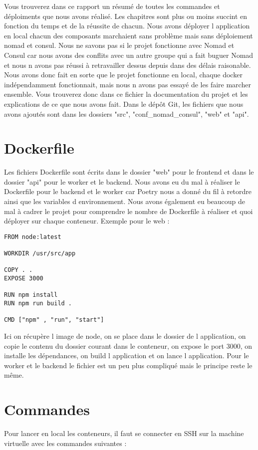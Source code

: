 \documentclass{report}
\begin{document}
Vous trouverez dans ce rapport un résumé de toutes les commandes et déploiments que nous avons réalisé. Les chapitres sont plus ou moins succint en fonction du temps et de la réussite de chacun.
Nous avons déployer l application en local chacun des composants marchaient sans problème mais sans déploiement nomad et consul.
Nous ne savons pas si le projet fonctionne avec Nomad et Consul car nous avons des conflits avec un autre groupe qui a fait buguer Nomad et nous n avons pas réussi à retravailler dessus depuis dans des délais raisonable. Nous avons donc fait en sorte que le projet fonctionne en local, chaque docker indépendamment fonctionnait, mais nous n avons pas essayé de les faire marcher ensemble. Vous trouverez donc dans ce fichier la documentation du projet et les explications de ce que nous avons fait. Dans le dépôt Git, les fichiers que nous avons ajoutés sont dans les dossiers "src", "conf\_nomad\_consul", "web" et "api".

\newpage

\chapter{Dockerfile}
Les fichiers Dockerfile sont écrits dans le dossier "web" pour le frontend et dans le dossier "api" pour le worker et le backend. Nous avons eu du mal à réaliser le Dockerfile pour le backend et le worker car Poetry nous a donné du fil à retordre ainsi que les variables d environnement. Nous avons également eu beaucoup de mal à cadrer le projet pour comprendre le nombre de Dockerfile à réaliser et quoi déployer sur chaque conteneur.
Exemple pour le web :
\begin{verbatim}
FROM node:latest    

WORKDIR /usr/src/app

COPY . .
EXPOSE 3000

RUN npm install 
RUN npm run build . 

CMD ["npm" , "run", "start"]
\end{verbatim}
Ici on récupère l image de node, on se place dans le dossier de l application, on copie le contenu du dossier courant dans le conteneur, on expose le port 3000, on installe les dépendances, on build l application et on lance l application.
Pour le worker et le backend le fichier est un peu plus compliqué mais le principe reste le même.
\newpage

\chapter{Commandes}
Pour lancer en local les conteneurs, il faut se connecter en SSH sur la machine virtuelle avec les commandes suivantes :
\end{document}
